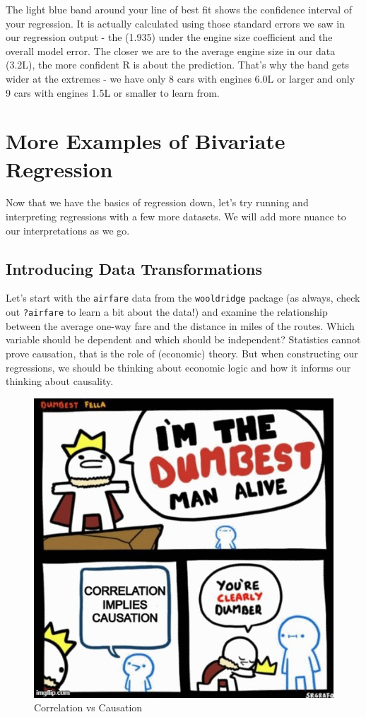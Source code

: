 \documentclass[
  letterpaper,
]{book}
\begin{document}
The light blue band around your line of best fit shows the confidence
interval of your regression. It is actually calculated using those
standard errors we saw in our regression output - the (1.935) under the
engine size coefficient and the overall model error. The closer we are
to the average engine size in our data (3.2L), the more confident R is
about the prediction. That's why the band gets wider at the extremes -
we have only 8 cars with engines 6.0L or larger and only 9 cars with
engines 1.5L or smaller to learn from.

\section{More Examples of Bivariate
Regression}\label{more-examples-of-bivariate-regression}

Now that we have the basics of regression down, let's try running and
interpreting regressions with a few more datasets. We will add more
nuance to our interpretations as we go.

\subsection{Introducing Data
Transformations}\label{introducing-data-transformations}

Let's start with the \texttt{airfare} data from the \texttt{wooldridge}
package (as always, check out \texttt{?airfare} to learn a bit about the
data!) and examine the relationship between the average one-way fare and
the distance in miles of the routes. Which variable should be dependent
and which should be independent? Statistics cannot prove causation, that
is the role of (economic) theory. But when constructing our regressions,
we should be thinking about economic logic and how it informs our
thinking about causality.

\begin{figure}[H]

{\centering \includegraphics[width=0.6\linewidth,height=\textheight,keepaspectratio]{images/dumbest.jpg}

}

\caption{Correlation vs Causation}

\end{figure}%
\end{document}
